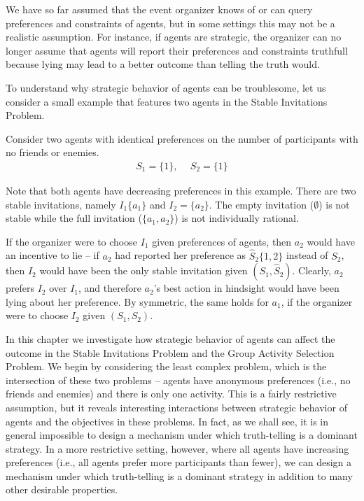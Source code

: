 \label{GT:chapter}


We have so far assumed that the event organizer knows of or can query preferences and constraints of agents, but in some settings this may not be a realistic assumption. For instance, if agents are strategic, the organizer can no longer assume that agents will report their preferences and constraints truthfull because lying may lead to a better outcome than telling the truth would.

To understand why strategic behavior of agents can be troublesome, let us consider a small example that features two agents in the Stable Invitations Problem.

\begin{example} \label{GT:eg:strategicAgents}
		Consider two agents with identical preferences on the number of participants with no friends or enemies. 
	\begin{equation*}
		\begin{aligned}
				S_1 = \{1\}, ~~& S_2 = \{1\}
		\end{aligned}
	\end{equation*}

Note that both agents have decreasing preferences in this example. 
There are two stable invitations, namely $I_1 \{a_1\}$ and $I_2 = \{a_2\}$. 
The empty invitation ($\emptyset$) is not stable while the full invitation ($\{a_1,a_2\}$) is not individually rational. 

If the organizer were to choose $I_1$ given preferences of agents, then $a_2$ would have an incentive to lie -- if $a_2$ had reported her preference as $\hat{S}_2 \{1, 2\}$ instead of $S_2$, then $I_2$ would have been the only stable invitation given $(S_1, \hat{S}_2)$. Clearly, $a_2$ prefers $I_2$ over $I_1$, and therefore $a_2$'s best action in hindsight would have been lying about her preference. By symmetric, the same holds for $a_1$, if the organizer were to choose $I_2$ given $(S_1, S_2)$.
\end{example}

In this chapter we investigate how strategic behavior of agents can affect the outcome in the Stable Invitations Problem and the Group Activity Selection Problem. We begin by considering the least complex problem, which is the intersection of these two problems -- agents have anonymous preferences (i.e., no friends and enemies) and there is only one activity. This is a fairly restrictive assumption, but it reveals interesting interactions between strategic behavior of agents and the objectives in these problems. In fact, as we shall see, it is in general impossible to design a mechanism under which truth-telling is a dominant strategy. In a more restrictive setting, however, where all agents have increasing preferences (i.e., all agents prefer more participants than fewer), we can design a mechanism under which truth-telling is a dominant strategy in addition to many other desirable properties. 



